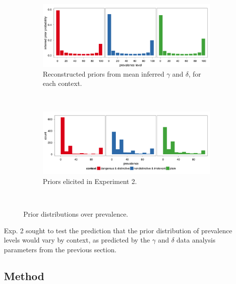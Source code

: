\documentclass[10pt,letterpaper]{article}
\begin{document}
\begin{figure}
        \centering
        \begin{subfigure}[b]{\columnwidth}
    			\includegraphics[width=\columnwidth]{inferred_mean_priors}
                \caption{Reconstructed priors from mean inferred $\gamma$ and $\delta$, for each context.}
                \label{fig:inferredpriors}
        \end{subfigure}%
        
        ~ %
        
        \begin{subfigure}[b]{\columnwidth}
                \includegraphics[width=\columnwidth]{elicited_priors}
                \caption{Priors elicited in Experiment 2.}
                \label{fig:elicitedpriors}
        \end{subfigure}
        ~ %
        \caption{Prior distributions over prevalence.}\label{fig:priors}
\end{figure}


Exp. 2 sought to test the prediction that the prior distribution of prevalence levels would vary by context, as predicted by the $\gamma$ and $\delta$ data analysis parameters from the previous section.

\subsection{Method}
\end{document}
